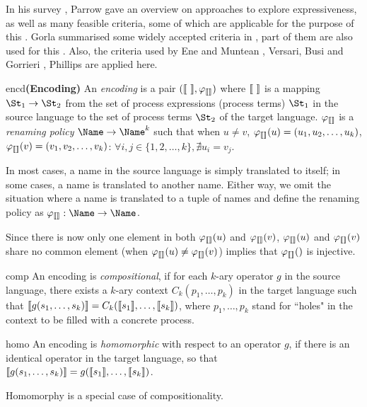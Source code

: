 \documentclass[adraft,hidelinks]{eptcs}
\begin{document}
In his survey \cite{JP08}, Parrow gave an overview on approaches to explore expressiveness, as well as many feasible criteria, some of which are applicable for the purpose of this \this.
Gorla summarised some widely accepted criteria in \cite{DG10}, part of them are also used for this \this.
Also, the criteria used by Ene and Muntean \cite{EM99}, Versari, Busi and Gorrieri \cite{VBG09}, Phillips \cite{IP08} are applied here.

\begin{definition}{encd}\textbf{(Encoding)}
  An \emph{encoding} is a pair $(\bkt{\ }, \varphi_{\bkt{}})$ where $\bkt{\ }$ is a mapping $\St_1\to\St_2$ from the set of process expressions (process terms) $\St_1$ in the source language to the set of process terms $\St_2$ of the target language.
  $\varphi_{\bkt{}}$ is a \emph{renaming policy} $\Name\to\Name^k$ such that when $u\neq v$, $\ren{u}=(u_1, u_2, \dots, u_k)$, $\ren{v}=(v_1, v_2, \dots, v_k)$: $\forall i,j\in\{1,2,\dots, k\}, \nexists u_i=v_j$.
\end{definition}

In most cases, a name in the source language is simply translated to itself; in some cases, a name is translated to another name.
Either way, we omit the situation where a name is translated to a tuple of names and define the renaming policy as $\varphi_{\bkt{}}: \Name\to\Name$.

Since there is now only one element in both $\ren{u}$ and $\ren{v}$, $\ren{u}$ and $\ren{v}$ share no common element (when $\ren{u} \neq \ren{v}$) implies that $\ren{}$ is injective.

\begin{criterion}{comp}
  An encoding is \emph{compositional}, if for each $k$-ary operator $g$ in the source language, there exists a $k$-ary context $C_k(p_1, \dots, p_k)$ in the target language such that
  $\bkt{g(s_1, \dots, s_k)} = C_k(\bkt{s_1}, \dots, \bkt{s_k})$, where $p_1,\dots,p_k$ stand for ``holes" in the context to be filled with a concrete process.
\end{criterion}

\begin{criterion}{homo}
  An encoding is \emph{homomorphic} with respect to an operator $g$, if there is an identical operator in the target language, so that $\bkt{g(s_1, \dots, s_k)} = g(\bkt{s_1}, \dots, \bkt{s_k})$.

  Homomorphy is a special case of compositionality.
\end{criterion}
\end{document}
